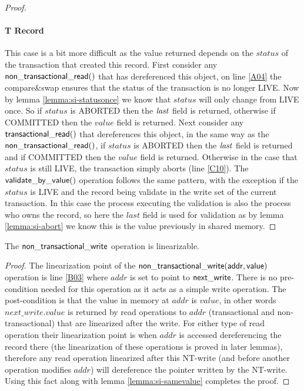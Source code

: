 \begin{proof}
\paragraph{T Record} This case is a bit more difficult as the value returned depends on the $\mathit{status}$ of the transaction
that created this record.
First consider any $\sf{non\_transactional\_read}()$ that has dereferenced this object, on line \ref{A04} the compare\&swap ensures that the status of the transaction is
no longer LIVE.
Now by lemma \ref{lemma:si-statusonce} we know that $\mathit{status}$ will only change from LIVE once.
So if $\mathit{status}$ is ABORTED then the $\ms{last}$ field is returned, otherwise if COMMITTED then the $\mathit{value}$ field is returned.
Next consider any $\sf{transactional\_read}()$ that dereferences this object, in the same way as the $\sf{non\_transactional\_read}()$, if
$\mathit{status}$ is ABORTED then the $\ms{last}$ field is returned and if COMMITTED then the $\mathit{value}$ field is returned.
Otherwise in the case that $\mathit{status}$ is still LIVE, the transaction simply aborts (line \ref{C10}).
The $\sf{validate\_by\_value}()$ operation follows the same pattern, with the exception if the $\mathit{status}$ is LIVE and
the record being validate in the write set of the current transaction.
In this case the process executing the validation is also the process who owns the record,
so here the $\mathit{last}$ field is used for validation as by lemma \ref{lemma:si-abort} we know this is the value previously
in shared memory.
\end{proof}




\begin{lemma}
\label{lemma:si-ntwrite}
The $\sf{non\_transactional\_write}$ operation is linearizable.
\end{lemma}
\begin{proof}
The linearization point of the $\sf{non\_transactional\_write}(addr,value)$ operation
is line \ref{B03} where $\mathit{addr}$ is set to point to $\sf{next\_write}$.
There is no pre-condition needed for this operation as it acts as a simple write operation.
The post-condition is that the value in memory at $\mathit{addr}$ is $\mathit{value}$, in other words $\mathit{next\_write.value}$ is returned by 
read operations to $\mathit{addr}$ (transactional and non-transactional) that are linearized after the write.
For either type of read operation their linearization point is when $\mathit{addr}$ is accessed dereferencing the record there
(the linearization of these operations is proved in later lemmas),
therefore any read operation linearized after this NT-write (and before another operation modifies $\mathit{addr}$)
will dereference the pointer written by the NT-write.
Using this fact along with lemma \ref{lemma:si-samevalue} completes the proof.
\end{proof}


